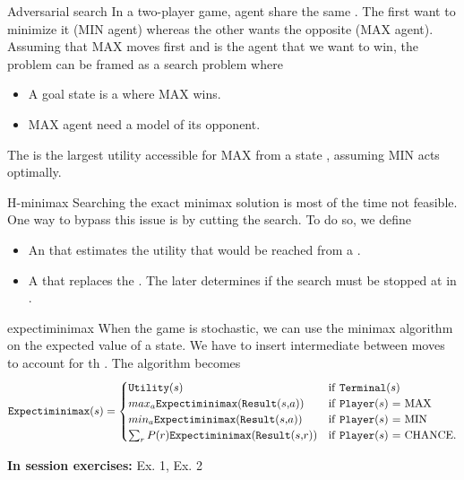 \documentclass[11pt, a4paper]{article}
\begin{document}
\begin{thbox}{Adversarial search}
    In a two-player game, agent share the same . 
    The first want to minimize it (MIN agent) whereas the other wants the opposite (MAX agent).
    Assuming that MAX moves first and is the agent that we want to win, the problem can be framed as a search problem where
    \begin{itemize}
        \item A goal state is a  where MAX wins.
        \item MAX agent need a model of its opponent.
    \end{itemize}

    The  is the largest utility accessible for MAX from a state , assuming MIN acts optimally.
\end{thbox}
\begin{thbox}{H-minimax}
    Searching the exact minimax solution is most of the time not feasible. One way to bypass this issue is by cutting the search.
    To do so, we define 
    \begin{itemize}
        \item An  that estimates the utility that would be reached from a .
        \item A  that replaces the . The later determines if the search must be stopped at  in .
    \end{itemize}
\end{thbox}
\begin{thbox}{expectiminimax}
    When the game is stochastic, we can use the minimax algorithm on the expected value of a state. We have to insert intermediate  between moves to account for th .
    The algorithm becomes 
    \[
    \text{\texttt{Expectiminimax}($s$)} = 
    \begin{cases}
        \text{\texttt{Utility}($s$)} & \text{if \texttt{Terminal}($s$)}\\
        max_a \text{\texttt{Expectiminimax}(\texttt{Result}($s$,$a$))} & \text{if \texttt{Player}($s$) = MAX}\\
        min_a \text{\texttt{Expectiminimax}(\texttt{Result}($s$,$a$))} & \text{if \texttt{Player}($s$) = MIN}\\
        \sum_r P(r) \text{\texttt{Expectiminimax}(\texttt{Result}($s$,$r$))} & \text{if \texttt{Player}($s$) = CHANCE}.
    \end{cases}
    \]
\end{thbox}
\textbf{In session exercises:} Ex. 1, Ex. 2 
\end{document}
